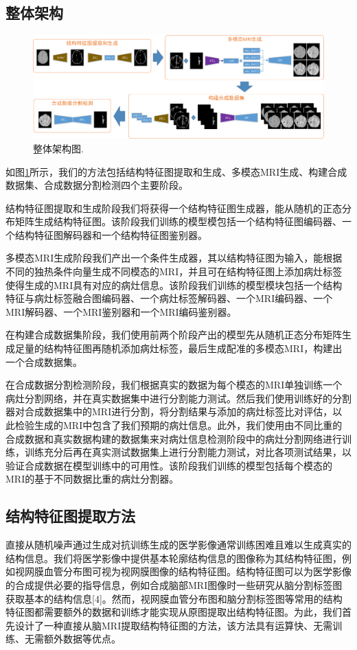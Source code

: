 \documentclass[letterpaper]{article} %
\begin{document}
\subsection{整体架构}
\begin{figure}
	\centering
	\includegraphics[width=0.98\linewidth]{figures/architecture}
	\caption{整体架构图.}
	\label{architecture}
\end{figure}
如图\ref{architecture}所示，我们的方法包括结构特征图提取和生成、多模态MRI生成、构建合成数据集、合成数据分割检测四个主要阶段。

结构特征图提取和生成阶段我们将获得一个结构特征图生成器，能从随机的正态分布矩阵生成结构特征图。该阶段我们训练的模型模包括一个结构特征图编码器、一个结构特征图解码器和一个结构特征图鉴别器。

多模态MRI生成阶段我们产出一个条件生成器，其以结构特征图为输入，能根据不同的独热条件向量生成不同模态的MRI，并且可在结构特征图上添加病灶标签使得生成的MRI具有对应的病灶信息。该阶段我们训练的模型模块包括一个结构特征与病灶标签融合图编码器、一个病灶标签解码器、一个MRI编码器、一个MRI解码器、一个MRI鉴别器和一个MRI编码鉴别器。

在构建合成数据集阶段，我们使用前两个阶段产出的模型先从随机正态分布矩阵生成足量的结构特征图再随机添加病灶标签，最后生成配准的多模态MRI，构建出一个合成数据集。

在合成数据分割检测阶段，我们根据真实的数据为每个模态的MRI单独训练一个病灶分割网络，并在真实数据集中进行分割能力测试。然后我们使用训练好的分割器对合成数据集中的MRI进行分割，将分割结果与添加的病灶标签比对评估，以此检验生成的MRI中包含了我们预期的病灶信息。此外，我们使用由不同比重的合成数据和真实数据构建的数据集来对病灶信息检测阶段中的病灶分割网络进行训练，训练充分后再在真实测试数据集上进行分割能力测试，对比各项测试结果，以验证合成数据在模型训练中的可用性。该阶段我们训练的模型包括每个模态的MRI的基于不同数据比重的病灶分割器。

\subsection{结构特征图提取方法}
直接从随机噪声通过生成对抗训练生成的医学影像通常训练困难且难以生成真实的结构信息。我们将医学影像中提供基本轮廓结构信息的图像称为其结构特征图，例如视网膜血管分布图可视为视网膜图像的结构特征图\cite{41costa2017towards}。结构特征图可以为医学影像的合成提供必要的指导信息，例如合成脑部MRI图像时一些研究从脑分割标签图获取基本的结构信息[4]。然而，视网膜血管分布图和脑分割标签图等常用的结构特征图都需要额外的数据和训练才能实现从原图提取出结构特征图。为此，我们首先设计了一种直接从脑MRI提取结构特征图的方法，该方法具有运算快、无需训练、无需额外数据等优点。
\end{document}
